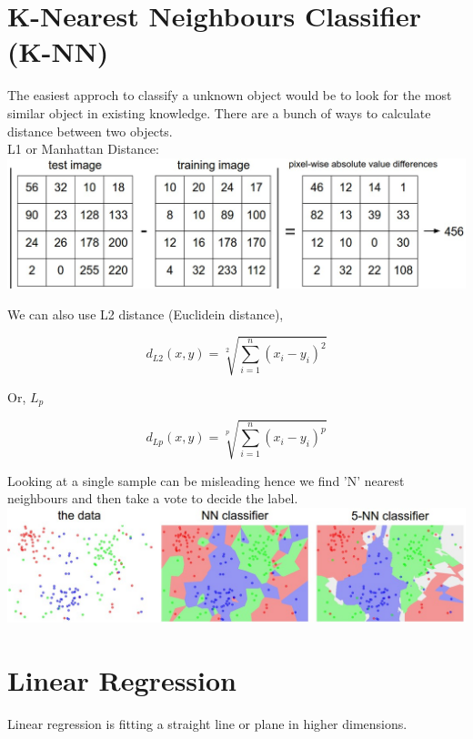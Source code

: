 \documentclass[11pt]{article}
\begin{document}
\section{K-Nearest Neighbours Classifier (K-NN)}
The easiest approch to classify a unknown object would be to look for the most similar object in existing knowledge. There are a bunch of ways to calculate distance between two objects.\\

\noindent L1 or Manhattan Distance:\\

\noindent \includegraphics[width=\textwidth]{l1.jpeg}

\noindent We can also use L2 distance (Euclidein distance),

$$ d_{L2}(x, y) = \sqrt[2]{\sum_{i=1}^{n} (x_i - y_i)^2 }$$

Or, $L_p$

$$ d_{Lp}(x, y) = \sqrt[p]{\sum_{i=1}^{n} (x_i - y_i)^p }$$

Looking at a single sample can be misleading hence we find 'N' nearest neighbours and then take a vote to decide the label.\\

\noindent \includegraphics[width=\textwidth]{knn.jpeg}

\clearpage

\section{Linear Regression}

Linear regression is fitting a straight line or plane in higher dimensions.\\
\end{document}
